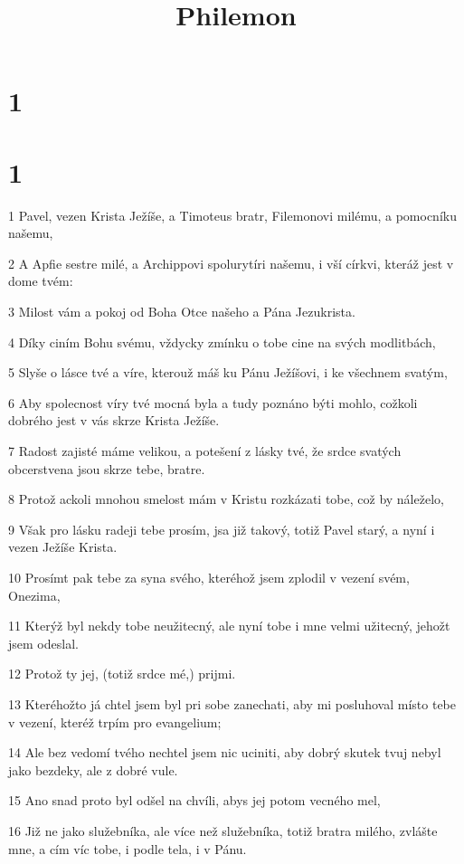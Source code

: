 

\title{Philemon}

\chapter{1}

\chapter{1}

\par 1 Pavel, vezen Krista Ježíše, a Timoteus bratr, Filemonovi milému, a pomocníku našemu,
\par 2 A Apfie sestre milé, a Archippovi spolurytíri našemu, i vší církvi, kteráž jest v dome tvém:
\par 3 Milost vám a pokoj od Boha Otce našeho a Pána Jezukrista.
\par 4 Díky ciním Bohu svému, vždycky zmínku o tobe cine na svých modlitbách,
\par 5 Slyše o lásce tvé a víre, kterouž máš ku Pánu Ježíšovi, i ke všechnem svatým,
\par 6 Aby spolecnost víry tvé mocná byla a tudy poznáno býti mohlo, cožkoli dobrého jest v vás skrze Krista Ježíše.
\par 7 Radost zajisté máme velikou, a potešení z lásky tvé, že srdce svatých obcerstvena jsou skrze tebe, bratre.
\par 8 Protož ackoli mnohou smelost mám v Kristu rozkázati tobe, což by náleželo,
\par 9 Však pro lásku radeji tebe prosím, jsa již takový, totiž Pavel starý, a nyní i vezen Ježíše Krista.
\par 10 Prosímt pak tebe za syna svého, kteréhož jsem zplodil v vezení svém, Onezima,
\par 11 Kterýž byl nekdy tobe neužitecný, ale nyní tobe i mne velmi užitecný, jehožt jsem odeslal.
\par 12 Protož ty jej, (totiž srdce mé,) prijmi.
\par 13 Kteréhožto já chtel jsem byl pri sobe zanechati, aby mi posluhoval místo tebe v vezení, kteréž trpím pro evangelium;
\par 14 Ale bez vedomí tvého nechtel jsem nic uciniti, aby dobrý skutek tvuj nebyl jako bezdeky, ale z dobré vule.
\par 15 Ano snad proto byl odšel na chvíli, abys jej potom vecného mel,
\par 16 Již ne jako služebníka, ale více než služebníka, totiž bratra milého, zvlášte mne, a cím víc tobe, i podle tela, i v Pánu.
